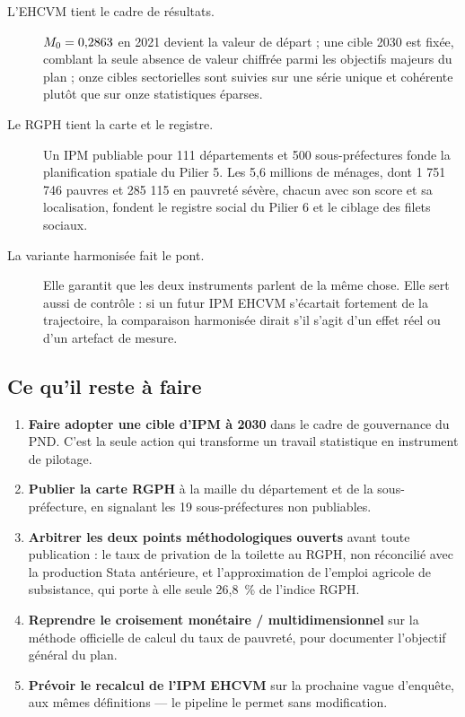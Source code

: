 \documentclass[11pt,a4paper]{article}
\begin{document}
\begin{description}
  \item[L'EHCVM tient le cadre de résultats.] $M_{0} = 0{,}2863$ en 2021 devient la valeur de
    départ ; une cible 2030 est fixée, comblant la seule absence de valeur chiffrée parmi les
    objectifs majeurs du plan ; onze cibles sectorielles sont suivies sur une série unique et
    cohérente plutôt que sur onze statistiques éparses.

  \item[Le RGPH tient la carte et le registre.] Un IPM publiable pour 111 départements et 500
    sous-préfectures fonde la planification spatiale du Pilier 5. Les 5,6 millions de ménages, dont
    1 751 746 pauvres et 285 115 en pauvreté sévère, chacun avec son score et sa localisation,
    fondent le registre social du Pilier 6 et le ciblage des filets sociaux.

  \item[La variante harmonisée fait le pont.] Elle garantit que les deux instruments parlent de la
    même chose. Elle sert aussi de contrôle : si un futur IPM EHCVM s'écartait fortement de la
    trajectoire, la comparaison harmonisée dirait s'il s'agit d'un effet réel ou d'un artefact de
    mesure.
\end{description}

\subsection{Ce qu'il reste à faire}

\begin{enumerate}
  \item \textbf{Faire adopter une cible d'IPM à 2030} dans le cadre de gouvernance du PND. C'est la
        seule action qui transforme un travail statistique en instrument de pilotage.
  \item \textbf{Publier la carte RGPH} à la maille du département et de la sous-préfecture, en
        signalant les 19 sous-préfectures non publiables.
  \item \textbf{Arbitrer les deux points méthodologiques ouverts} avant toute publication : le taux
        de privation de la toilette au RGPH, non réconcilié avec la production Stata antérieure, et
        l'approximation de l'emploi agricole de subsistance, qui porte à elle seule 26,8~\% de
        l'indice RGPH.
  \item \textbf{Reprendre le croisement monétaire / multidimensionnel} sur la méthode officielle de
        calcul du taux de pauvreté, pour documenter l'objectif général du plan.
  \item \textbf{Prévoir le recalcul de l'IPM EHCVM} sur la prochaine vague d'enquête, aux mêmes
        définitions --- le pipeline le permet sans modification.
\end{enumerate}
\end{document}

